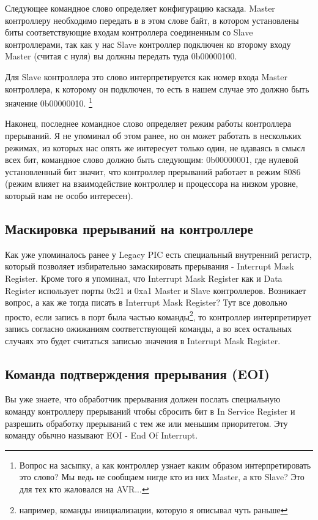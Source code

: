 Следующее командное слово определяет конфигурацию каскада. Master контроллеру
необходимо передать в в этом слове байт, в котором установлены биты
соответствующие входам контроллера соединенным со Slave контроллерами, так как
у нас Slave контроллер подключен ко второму входу Master (считая с нуля) вы
должны передать туда 0b00000100.

Для Slave контроллера это слово интерпретируется как номер входа Master
контроллера, к которому он подключен, то есть в нашем случае это должно быть
значение 0b00000010. \footnote{Вопрос на засыпку, а как контроллер узнает каким
образом интерпретировать это слово? Мы ведь не сообщаем нигде кто из них Master,
а кто Slave? Это для тех кто жаловался на AVR...}

Наконец, последнее командное слово определяет режим работы контроллера
прерываний. Я не упоминал об этом ранее, но он может работать в нескольких
режимах, из которых нас опять же интересует только один, не вдаваясь в смысл
всех бит, командное слово должно быть следующим: 0b00000001, где нулевой
установленный бит значит, что контроллер прерываний работает в режим 8086
(режим влияет на взаимодействие контроллер и процессора на низком уровне,
который нам не особо интересен).

\subsection{Маскировка прерываний на контроллере}

Как уже упоминалось ранее у Legacy PIC есть специальный внутренний регистр,
который позволяет избирательно замаскировать прерывания - Interrupt Mask
Register. Кроме того я упоминал, что Interrupt Mask Register как и Data Register
использует порты 0x21 и 0xa1 Master и Slave контроллеров. Возникает вопрос, а
как же тогда писать в Interrupt Mask Register? Тут все довольно просто, если
запись в порт была частью команды\footnote{например, команды инициализации,
которую я описывал чуть раньше}, то контроллер интерпретирует запись согласно
ожижаниям соответствующей команды, а во всех остальных случаях это будет
считаться записью значения в Interrupt Mask Register.

\subsection{Команда подтверждения прерывания (EOI)}

Вы уже знаете, что обработчик прерывания должен послать специальную команду
контроллеру прерываний чтобы сбросить бит в In Service Register и разрешить
обработку прерываний с тем же или меньшим приоритетом. Эту команду обычно
называют EOI - End Of Interrupt.

